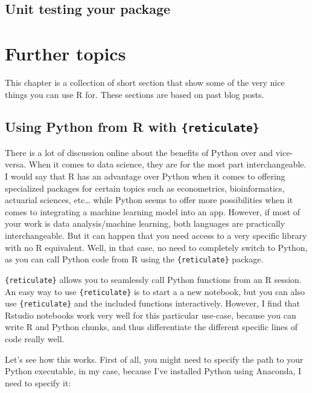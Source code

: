 \documentclass[
]{article}
\begin{document}
\hypertarget{unit-testing-your-package}{%
\subsection{Unit testing your package}\label{unit-testing-your-package}}

\hypertarget{further-topics}{%
\section{Further topics}\label{further-topics}}

This chapter is a collection of short section that show some of the very nice things you can use
R for. These sections are based on past blog posts.

\hypertarget{using-python-from-r-with-reticulate}{%
\subsection{\texorpdfstring{Using Python from R with \texttt{\{reticulate\}}}{Using Python from R with \{reticulate\}}}\label{using-python-from-r-with-reticulate}}

There is a lot of discussion online about the benefits of Python over and vice-versa. When it comes
to data science, they are for the most part interchangeable. I would say that R has an advantage
over Python when it comes to offering specialized packages for certain topics such as
econometrics, bioinformatics, actuarial sciences, etc\ldots{} while Python seems to offer more possibilities
when it comes to integrating a machine learning model into an app.
However, if most of your work is data analysis/machine learning, both languages are practically
interchangeable. But it can happen that you need access to a very specific library with no R
equivalent. Well, in that case, no need to completely switch to Python, as you can call Python code
from R using the \texttt{\{reticulate\}} package.

\texttt{\{reticulate\}} allows you to seamlessly call Python functions from an R session. An easy way to use
\texttt{\{reticulate\}} is to start a a new notebook, but you can also use \texttt{\{reticulate\}} and the included
functions interactively. However, I find that Rstudio notebooks work very well for this particular
use-case, because you can write R and Python chunks, and thus differentiate the different
specific lines of code really well.

Let's see how this works. First of all, you might need to specify the path to your Python executable,
in my case, because I've installed Python using Anaconda, I need to specify it:
\end{document}

